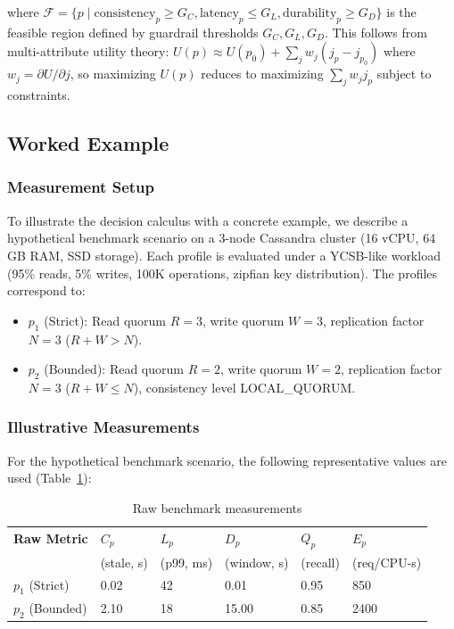 \documentclass[conference]{IEEEtran}
\begin{document}
{{where $\mathcal{F} = \{p \mid \text{consistency}_p \geq G_C, \text{latency}_p \leq G_L, \text{durability}_p \geq G_D\}$ is the feasible region defined by guardrail thresholds $G_C, G_L, G_D$. This follows from multi-attribute utility theory: $U(p) \approx U(p_0) + \sum_j w_j (j_p - j_{p_0})$ where $w_j = \partial U/\partial j$, so maximizing $U(p)$ reduces to maximizing $\sum_j w_j j_p$ subject to constraints.

\subsection{Worked Example}

\subsubsection{Measurement Setup}
To illustrate the decision calculus with a concrete example, we describe a hypothetical benchmark scenario on a 3-node Cassandra cluster (16 vCPU, 64 GB RAM, SSD storage). Each profile is evaluated under a YCSB-like workload (95\% reads, 5\% writes, 100K operations, zipfian key distribution). The profiles correspond to:
\begin{itemize}
    \item $p_1$ (Strict): Read quorum $R=3$, write quorum $W=3$, replication factor $N=3$ ($R+W > N$).
    \item $p_2$ (Bounded): Read quorum $R=2$, write quorum $W=2$, replication factor $N=3$ ($R+W \leq N$), consistency level LOCAL\_QUORUM.
\end{itemize}

\subsubsection{Illustrative Measurements}
For the hypothetical benchmark scenario, the following representative values are used (Table~\ref{tab:raw-benchmark}):

\begin{table}[h]
\caption{Raw benchmark measurements}
\label{tab:raw-benchmark}
\centering
\small
\renewcommand{\arraystretch}{1.1}

\begin{tabularx}{\columnwidth}{@{}lXXXXX@{}}
\toprule
\textbf{Raw Metric} &
\textbf{$C_p$} &
\textbf{$L_p$} &
\textbf{$D_p$} &
\textbf{$Q_p$} &
\textbf{$E_p$} \\
&
(stale, s) &
(p99, ms) &
(window, s) &
(recall) &
(req/CPU-s) \\
\midrule
$p_1$ (Strict)  & 0.02 & 42 & 0.01 & 0.95 & 850 \\
$p_2$ (Bounded) & 2.10 & 18 & 15.00 & 0.85 & 2400 \\
\bottomrule
\end{tabularx}
\end{table}

}}
\end{document}
